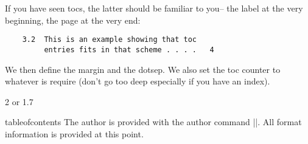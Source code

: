 \begin{multicols}{2}
If you have seen tocs, the latter should be familiar to you--
the label at the very beginning, the page at the very end:
\columnbreak

\topline
\begin{verbatim}
    3.2  This is an example showing that toc
         entries fits in that scheme . . . .   4
\end{verbatim}
\bottomline
\end{multicols}


\begin{teX}
\newcommand\@pnumwidth{1.55em}%
\end{teX}

We then define the margin and the dotsep. We also set the toc counter to whatever is require (don't go too deep especially if you have an index).

\begin{teX}
\newcommand\@tocrmarg{2.55em}%
\newcommand\@dotsep{4.5}%
2 or 1.7
\end{teX}

\begin{docCommand}{tableofcontents}{}
 The author is provided with the author command |\tableofcontents|. All format information is provided at this point.
\end{docCommand}

\begin{teX}
\setcounter{tocdepth}{2}
\newcommand\tableofcontents{%
    \if@twocolumn
      \@restonecoltrue\onecolumn
    \else
      \@restonecolfalse
    \fi
    \chapter*{\contentsname
        \@mkboth{%
           \MakeUppercase\contentsname}{\MakeUppercase\contentsname}}%
    \@starttoc{toc}%
    \if@restonecol\twocolumn\fi
    }
\end{teX}

